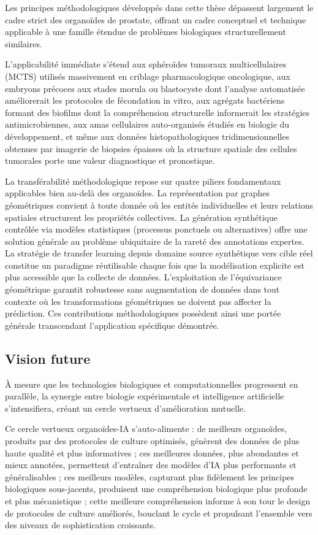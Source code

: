Les principes méthodologiques développés dans cette thèse dépassent largement le cadre strict des organoïdes de prostate, offrant un cadre conceptuel et technique applicable à une famille étendue de problèmes biologiques structurellement similaires.

L'applicabilité immédiate s'étend aux sphéroïdes tumoraux multicellulaires (MCTS) utilisés massivement en criblage pharmacologique oncologique, aux embryons précoces aux stades morula ou blastocyste dont l'analyse automatisée améliorerait les protocoles de fécondation in vitro, aux agrégats bactériens formant des biofilms dont la compréhension structurelle informerait les stratégies antimicrobiennes, aux amas cellulaires auto-organisés étudiés en biologie du développement, et même aux données histopathologiques tridimensionnelles obtenues par imagerie de biopsies épaisses où la structure spatiale des cellules tumorales porte une valeur diagnostique et pronostique.

La transférabilité méthodologique repose sur quatre piliers fondamentaux applicables bien au-delà des organoïdes. La représentation par graphes géométriques convient à toute donnée où les entités individuelles et leurs relations spatiales structurent les propriétés collectives. La génération synthétique contrôlée via modèles statistiques (processus ponctuels ou alternatives) offre une solution générale au problème ubiquitaire de la rareté des annotations expertes. La stratégie de transfer learning depuis domaine source synthétique vers cible réel constitue un paradigme réutilisable chaque fois que la modélisation explicite est plus accessible que la collecte de données. L'exploitation de l'équivariance géométrique garantit robustesse sans augmentation de données dans tout contexte où les transformations géométriques ne doivent pas affecter la prédiction. Ces contributions méthodologiques possèdent ainsi une portée générale transcendant l'application spécifique démontrée.

\subsection{Vision future}

À mesure que les technologies biologiques et computationnelles progressent en parallèle, la synergie entre biologie expérimentale et intelligence artificielle s'intensifiera, créant un cercle vertueux d'amélioration mutuelle.

Ce cercle vertueux organoïdes-IA s'auto-alimente : de meilleurs organoïdes, produits par des protocoles de culture optimisés, génèrent des données de plus haute qualité et plus informatives ; ces meilleures données, plus abondantes et mieux annotées, permettent d'entraîner des modèles d'IA plus performants et généralisables ; ces meilleurs modèles, capturant plus fidèlement les principes biologiques sous-jacents, produisent une compréhension biologique plus profonde et plus mécanistique ; cette meilleure compréhension informe à son tour le design de protocoles de culture améliorés, bouclant le cycle et propulsant l'ensemble vers des niveaux de sophistication croissants.


